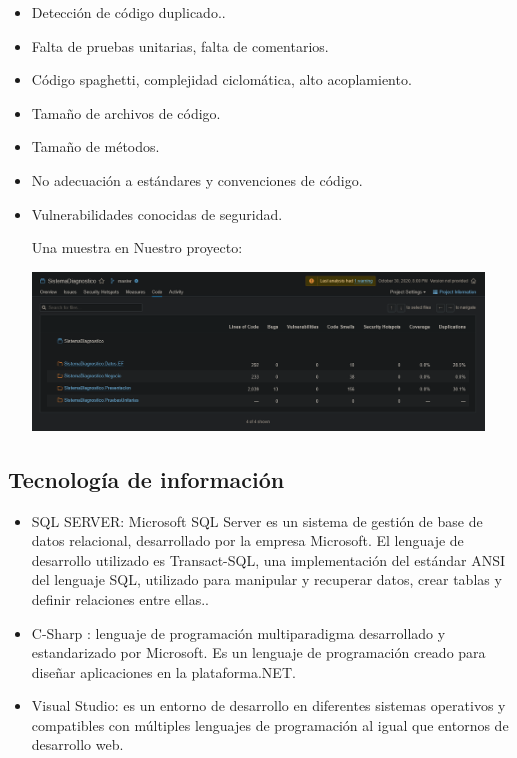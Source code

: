 \documentclass[preprint,12pt]{elsarticle}
\begin{document}
\begin{itemize}
	\item Detección de código duplicado..
	\item Falta de pruebas unitarias, falta de comentarios. 
	\item Código spaghetti, complejidad ciclomática, alto acoplamiento.
	\item Tamaño de archivos de código.
	\item Tamaño de métodos.
	\item No adecuación a estándares y convenciones de código.
	\item Vulnerabilidades conocidas de seguridad.
	
	Una muestra en Nuestro proyecto:
		
\begin{center}
	\includegraphics[width=12cm]{./imagen/Screenshot_2020-10-30 Code.png} 
	\end{center}
\end{itemize}

\subsection{\textbf{Tecnología de información  }}
		\begin{itemize}
	\item 	SQL SERVER: Microsoft SQL Server es un sistema de gestión de base de datos relacional, desarrollado por la empresa Microsoft. El lenguaje de desarrollo utilizado es Transact-SQL, una implementación del estándar ANSI del lenguaje SQL, utilizado para manipular y recuperar datos, crear tablas y definir relaciones entre ellas..
	\item 	C-Sharp : lenguaje de programación multiparadigma desarrollado y estandarizado por Microsoft. Es un lenguaje de programación creado para diseñar aplicaciones en la plataforma.NET.
	\item 	Visual Studio: es un entorno de desarrollo en diferentes sistemas operativos y compatibles con múltiples lenguajes de programación al igual que entornos de desarrollo web. 
	\end{itemize}
\end{document}
